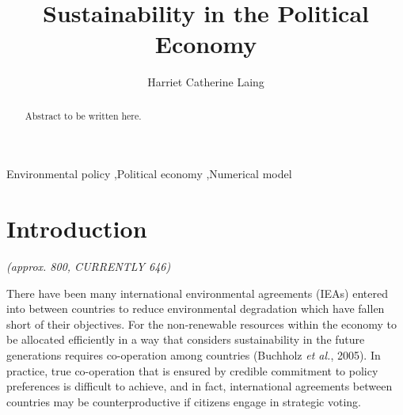 \documentclass[11pt,preprint, authoryear]{elsarticle}
\numberwithin{equation}{section}
\numberwithin{figure}{section}
\numberwithin{table}{section}
\begin{document}
\begin{frontmatter}  %

\title{Sustainability in the Political Economy}





\author[Add1]{Harriet Catherine Laing}





\address[Add1]{University of Stellenbosch, South Africa}


\begin{abstract}
\small{
Abstract to be written here.
}
\end{abstract}

\vspace{1cm}


\begin{keyword}
\footnotesize{
Environmental policy \sep Political economy \sep Numerical model \\
\vspace{0.3cm}
}
\end{keyword}



\vspace{0.5cm}

\end{frontmatter}



\pagestyle{fancy}
\chead{}
\rhead{}
\lfoot{}
\lhead{}
\cfoot{}


\headsep 35pt %




\hypertarget{introduction}{%
\section{Introduction}\label{introduction}}

\emph{(approx. 800, CURRENTLY 646)}

There have been many international environmental agreements (IEAs)
entered into between countries to reduce environmental degradation which
have fallen short of their objectives. For the non-renewable resources
within the economy to be allocated efficiently in a way that considers
sustainability in the future generations requires co-operation among
countries (Buchholz \emph{et al.}, 2005). In practice, true co-operation
that is ensured by credible commitment to policy preferences is
difficult to achieve, and in fact, international agreements between
countries may be counterproductive if citizens engage in strategic
voting.
\end{document}
